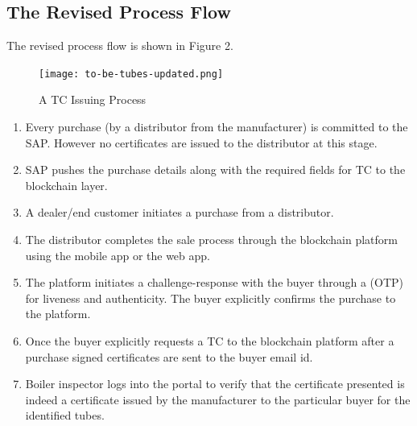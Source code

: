 \documentclass{article}
\begin{document}
\subsection{The Revised Process Flow}
The revised process flow is shown in Figure 2.
\begin{figure}[ht]
\centering
 \texttt{[image: to-be-tubes-updated.png]}
\caption{A TC Issuing Process}
\end{figure}
\begin{enumerate} 
\item
Every purchase (by a distributor from the manufacturer) is committed to the SAP. However no certificates are issued to the distributor at this stage. 
\item
SAP pushes the purchase details along with the required fields for TC to the blockchain layer.  
\item
A dealer/end customer initiates a purchase from a distributor. 
\item
The distributor completes the sale process through the blockchain platform using the mobile app or the web app. 
\item
The platform initiates a challenge-response with the buyer through a (OTP) for liveness and authenticity. The buyer explicitly confirms the purchase to the platform.
\item
Once the buyer explicitly requests a TC to the blockchain platform after a purchase signed certificates are sent to the buyer email id. 
\item
Boiler inspector logs into the portal to verify that the certificate presented is indeed a certificate issued by the manufacturer to the particular buyer for the identified tubes.  
\end{enumerate}
\end{document}

